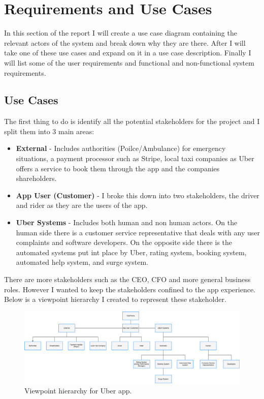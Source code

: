 \documentclass{article}
\begin{document}
    \section{Requirements and Use Cases}
    In this section of the report I will create a use case diagram containing the relevant actors of the system and break down why they are there. After I will
    take one of these use cases and expand on it in a use case description. Finally I will list some of the user requirements and functional and non-functional system
    requirements.

    \subsection{Use Cases}
    The first thing to do is identify all the potential stakeholders for the project and I split them into 3 main areas: 
    \begin{itemize}
      \item \textbf{External} - Includes authorities (Poilce/Ambulance) for emergency situations, a payment processor such as Stripe, local taxi 
            companies as Uber offers a service to book them through the app and the companies shareholders.
      \item \textbf{App User (Customer)} - I broke this down into two stakeholders, the driver and rider as they are the users of the app.
      \item \textbf{Uber Systems} - Includes both human and non human actors. On the human side there is a customer service representative that deals with any
            user complaints and software developers. On the opposite side there is the automated systems put int place by Uber, rating system, booking system, automated help system,
            and surge system.
    \end{itemize}
    There are more stakeholders such as the CEO, CFO and more general business roles. However I wanted to keep the stakeholders confined to the app experience.
    Below is a viewpoint hierarchy I created to represent these stakeholder.
    \begin{figure}[H]
      \centering
      \includegraphics[width=12cm]{assets/viewpoints.drawio.png}
      \caption{Viewpoint hierarchy for Uber app.}
      \label{fig:viewpoints}
    \end{figure}
\end{document}

